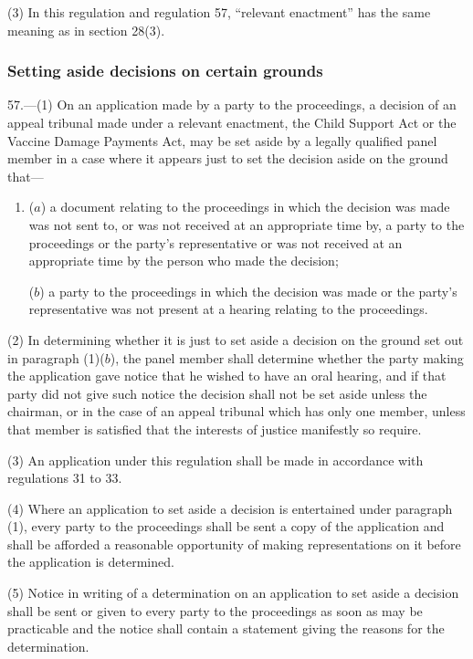\documentclass[12pt,a4paper]{article}
\begin{document}
(3) In this regulation and regulation 57, “relevant enactment” has the same meaning as in section 28(3).

\subsubsection[57. Setting aside decisions on certain grounds]{Setting aside decisions on certain grounds}

57.—(1) On an application made by a party to the proceedings, a decision of an appeal tribunal made under a relevant enactment, the Child Support Act or the Vaccine Damage Payments Act, may be set aside by a legally qualified panel member in a case where it appears just to set the decision aside on the ground that—
\begin{enumerate}\item[]
($a$) a document relating to the proceedings in which the decision was made was not sent to, or was not received at an appropriate time by, a party to the proceedings or the party’s representative or was not received at an appropriate time by the person who made the decision;

($b$) a party to the proceedings in which the decision was made or the party’s representative was not present at a hearing relating to the proceedings.
\end{enumerate}

(2) In determining whether it is just to set aside a decision on the ground set out in paragraph (1)($b$), the panel member shall determine whether the party making the application gave notice that he wished to have an oral hearing, and if that party did not give such notice the decision shall not be set aside unless the chairman, or in the case of an appeal tribunal which has only one member, unless that member is satisfied that the interests of justice manifestly so require.

(3) An application under this regulation shall be made in accordance with regulations 31 to 33.

(4) Where an application to set aside a decision is entertained under paragraph (1), every party to the proceedings shall be sent a copy of the application and shall be afforded a reasonable opportunity of making representations on it before the application is determined.

(5) Notice in writing of a determination on an application to set aside a decision shall be sent or given to every party to the proceedings as soon as may be practicable and the notice shall contain a statement giving the reasons for the determination.
\end{document}
